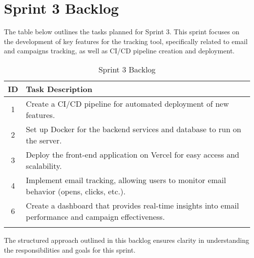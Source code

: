 \section{Sprint 3 Backlog}

The table below outlines the tasks planned for Sprint 3. This sprint focuses on the development of key features for the tracking tool, specifically related to email and campaigns tracking, as well as CI/CD pipeline creation and deployment.

\begin{longtable}{|c|p{}|}
    \hline
    \textbf{ID} & \textbf{Task Description} \\
    \hline
    1 & Create a CI/CD pipeline for automated deployment of new features. \\
    \hline
    2 & Set up Docker for the backend services and database to run on the server. \\
    \hline
    3 & Deploy the front-end application on Vercel for easy access and scalability. \\
    \hline
    4 & Implement email tracking, allowing users to monitor email behavior (opens, clicks, etc.). \\
    \hline
    6 & Create a dashboard that provides real-time insights into email performance and campaign effectiveness. \\
    \hline
    \caption{Sprint 3 Backlog}
    \label{tab:Sprint3Backlog}
\end{longtable}

The structured approach outlined in this backlog ensures clarity in understanding the responsibilities and goals for this sprint.